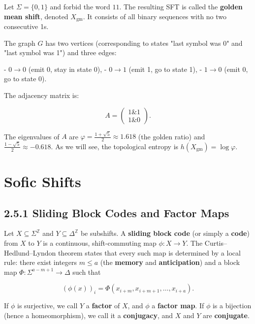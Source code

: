 \begin{example}
Let $\Sigma = \{ 0, 1\} $ and forbid the word $11$. The resulting SFT is called the \textbf{golden mean shift}, denoted $X_{\text{gm}}$. It consists of all binary sequences with no two consecutive 1s.

The graph $G$ has two vertices (corresponding to states "last symbol was 0" and "last symbol was 1") and three edges:

- $0 \to 0$ (emit 0, stay in state 0),
- $0 \to 1$ (emit 1, go to state 1),
- $1 \to 0$ (emit 0, go to state 0).

The adjacency matrix is:

\[A = \begin{pmatrix} 1 \& 1 \\ 1 \& 0 \end{pmatrix}.\]

The eigenvalues of $A$ are $\varphi = \frac{1 + \sqrt{5}}{2} \approx 1.618$ (the golden ratio) and $\frac{1 - \sqrt{5}}{2} \approx -0.618$. As we will see, the topological entropy is $h(X_{\text{gm}}) = \log \varphi$.
\end{example}



\section{Sofic Shifts}

\subsection{2.5.1 Sliding Block Codes and Factor Maps}

\begin{definition}
Let $X \subseteq \Sigma^{\mathbb{Z}}$ and $Y \subseteq \Delta^{\mathbb{Z}}$ be subshifts. A \textbf{sliding block code} (or simply a \textbf{code}) from $X$ to $Y$ is a continuous, shift-commuting map $\phi : X \to Y$. The Curtis--Hedlund--Lyndon theorem states that every such map is determined by a local rule: there exist integers $m \leq a$ (the \textbf{memory} and \textbf{anticipation}) and a block map $\Phi : \Sigma^{a - m + 1} \to \Delta$ such that

\[(\phi(x))_i = \Phi(x_{i+m}, x_{i+m+1}, \ldots, x_{i+a}).\]

If $\phi$ is surjective, we call $Y$ a \textbf{factor} of $X$, and $\phi$ a \textbf{factor map}. If $\phi$ is a bijection (hence a homeomorphism), we call it a \textbf{conjugacy}, and $X$ and $Y$ are \textbf{conjugate}.
\end{definition}

